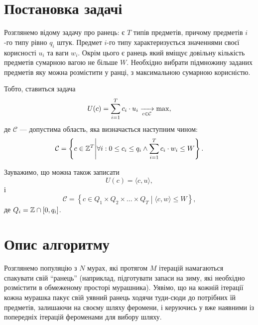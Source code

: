 \documentclass[a4paper, 12pt]{article}
\author{Скибицький Нікіта}
\date{\today}
\numberwithin{equation}{section}
\begin{document}

\people

\tableofcontents

\section{Постановка задачі}

Розглянемо відому задачу про ранець: є $T$ типів предметів, причому предметів $i$-го типу рівно $q_i$ штук. Предмет $i$-го типу характеризується значеннями своєї корисності $u_i$ та ваги $w_i$. Окрім цього є ранець який вміщує довільну кількість предметів сумарною вагою не більше $W$. Необхідно вибрати підмножину заданих предметів яку можна розмістити у ранці, з максимальною сумарною корисністю. \medskip

Тобто, ставиться задача
\begin{equation}
    U(c) = \operatorname*{\sum}_{i = 1}^T c_i \cdot u_i \xrightarrow[c \in \mathcal{C}]{} \max,
\end{equation}
де $\mathcal{C}$ --- допустима область, яка визначається наступним чином:
\begin{equation}
    \mathcal{C} = \left\{ c \in \mathbb{Z}^T \middle| \forall i: 0 \le c_i \le q_i \land \operatorname*{\sum}_{i = 1}^T c_i \cdot w_i \le W \right\}.
\end{equation}

Зауважимо, що можна також записати
\begin{equation}
    U(c) = \langle c, u \rangle,
\end{equation}
і
\begin{equation}
    \mathcal{C} = \left\{ c \in Q_1 \times Q_2 \times \ldots \times Q_T \middle| \langle c, w \rangle \le W \right\},
\end{equation}
де $Q_i = \mathbb{Z} \cap [0, q_i]$.

\section{Опис алгоритму}

Розглянемо популяцію з $N$ мурах, які протягом $M$ ітерацій намагаються спакувати свій ``ранець'' (наприклад, підготувати запаси на зиму, які необхідно розмістити в обмеженому просторі мурашника). Уявімо, що на кожній ітерації кожна мурашка пакує свій уявний ранець ходячи туди-сюди до потрібних їй предметів, залишаючи на своєму шляху феромени, і керуючись у вже наявними із попередніх ітерацій фероменами для вибору шляху.
\end{document}
